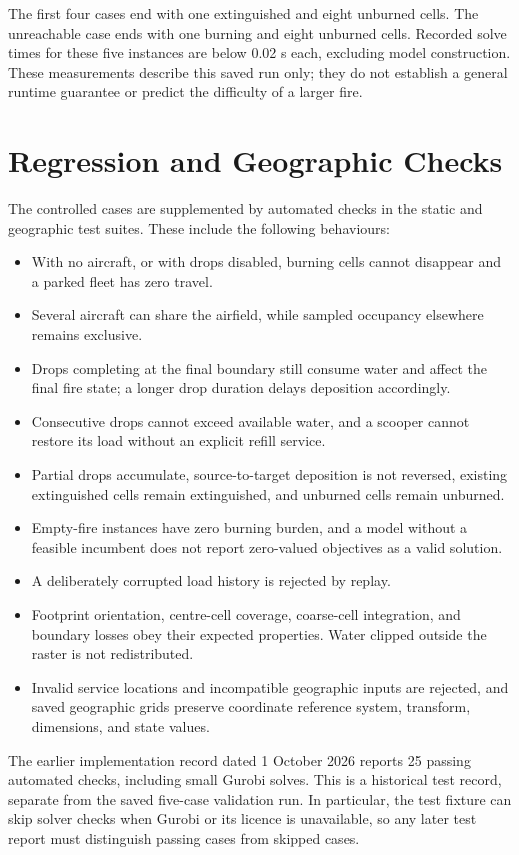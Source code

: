 The first four cases end with one extinguished and eight unburned cells. The unreachable case ends with one burning and eight unburned cells. Recorded solve times for these five instances are below 0.02 s each, excluding model construction. These measurements describe this saved run only; they do not establish a general runtime guarantee or predict the difficulty of a larger fire.

\section{Regression and Geographic Checks}
\label{sec:validation-regression}

The controlled cases are supplemented by automated checks in the static and geographic test suites. These include the following behaviours:
\begin{itemize}
    \item With no aircraft, or with drops disabled, burning cells cannot disappear and a parked fleet has zero travel.
    \item Several aircraft can share the airfield, while sampled occupancy elsewhere remains exclusive.
    \item Drops completing at the final boundary still consume water and affect the final fire state; a longer drop duration delays deposition accordingly.
    \item Consecutive drops cannot exceed available water, and a scooper cannot restore its load without an explicit refill service.
    \item Partial drops accumulate, source-to-target deposition is not reversed, existing extinguished cells remain extinguished, and unburned cells remain unburned.
    \item Empty-fire instances have zero burning burden, and a model without a feasible incumbent does not report zero-valued objectives as a valid solution.
    \item A deliberately corrupted load history is rejected by replay.
    \item Footprint orientation, centre-cell coverage, coarse-cell integration, and boundary losses obey their expected properties. Water clipped outside the raster is not redistributed.
    \item Invalid service locations and incompatible geographic inputs are rejected, and saved geographic grids preserve coordinate reference system, transform, dimensions, and state values.
\end{itemize}
The earlier implementation record dated 1 October 2026 reports 25 passing automated checks, including small Gurobi solves. This is a historical test record, separate from the saved five-case validation run. In particular, the test fixture can skip solver checks when Gurobi or its licence is unavailable, so any later test report must distinguish passing cases from skipped cases.

